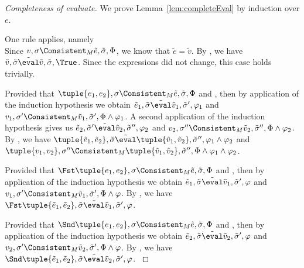 \begin{proof}[Completeness of evaluate]
  We prove Lemma~\ref{lem:completeEval} by induction over $e$.

    {One rule applies, namely \\
    Since $v,\sigma\Consistent_M \tilde{e},\tilde{\sigma},\Phi$, we know that $\tilde{e}=\tilde{v}$.
    By , we have $\tilde{v},\tilde{\sigma}\tilde{\eval}\tilde{v},\tilde{\sigma},\True$.
    Since the expressions did not change, this case holds trivially.
    }

    {
    Provided that $\tuple{e_1, e_2},\sigma\Consistent_M \tilde{e},\tilde{\sigma},\Phi$ and ,
    then by application of the induction hypothesis we obtain $\tilde{e}_1,\tilde{\sigma}\tilde{\eval}\tilde{v}_1,\tilde{\sigma}',\phi_1$
    and $v_1,\sigma'\Consistent_M \tilde{v}_1,\tilde{\sigma}',\Phi\land\phi_1$.
    A second application of the induction hypothesis gives us  $\tilde{e}_2,\tilde{\sigma}'\tilde{\eval}\tilde{v}_2,\tilde{\sigma}'',\phi_2$
    and $v_2,\sigma''\Consistent_M \tilde{v}_2,\tilde{\sigma}'',\Phi\land\phi_2$.
    By , we have $\tuple{\tilde{e}_1, \tilde{e}_2},\tilde{\sigma}\tilde{\eval}\tuple{\tilde{v}_1,\tilde{v}_2},\tilde{\sigma}'',\phi_1\land\phi_2$ and $\tuple{v_1,v_2},\sigma''\Consistent_M \tuple{\tilde{v}_1,\tilde{v}_2},\tilde{\sigma}'',\Phi\land\phi_1\land\phi_2$.
    }

  {
    Provided that $\Fst \tuple{e_1,e_2},\sigma\Consistent_M \tilde{e},\tilde{\sigma},\Phi$ and ,
    then by application of the induction hypothesis we obtain $\tilde{e}_1,\tilde{\sigma}\tilde{\eval}\tilde{v}_1,\tilde{\sigma}',\phi$
    and $v_1,\sigma'\Consistent_M \tilde{v}_1,\tilde{\sigma}',\Phi\land\phi$.
    By , we have $\Fst \tuple{\tilde{e}_1,\tilde{e}_2},\tilde{\sigma}\tilde{\eval}\tilde{v}_1,\tilde{\sigma}',\phi$.
    }

  {
  Provided that $\Snd \tuple{e_1,e_2},\sigma\Consistent_M \tilde{e},\tilde{\sigma},\Phi$ and ,
  then by application of the induction hypothesis we obtain $\tilde{e}_2,\tilde{\sigma}\tilde{\eval}\tilde{v}_2,\tilde{\sigma}',\phi$
  and $v_2,\sigma'\Consistent_M \tilde{v}_2,\tilde{\sigma}',\Phi\land\phi$.
  By , we have $\Snd \tuple{\tilde{e}_1,\tilde{e}_2},\tilde{\sigma}\tilde{\eval}\tilde{v}_2,\tilde{\sigma}',\phi$.
    }


\end{proof}
